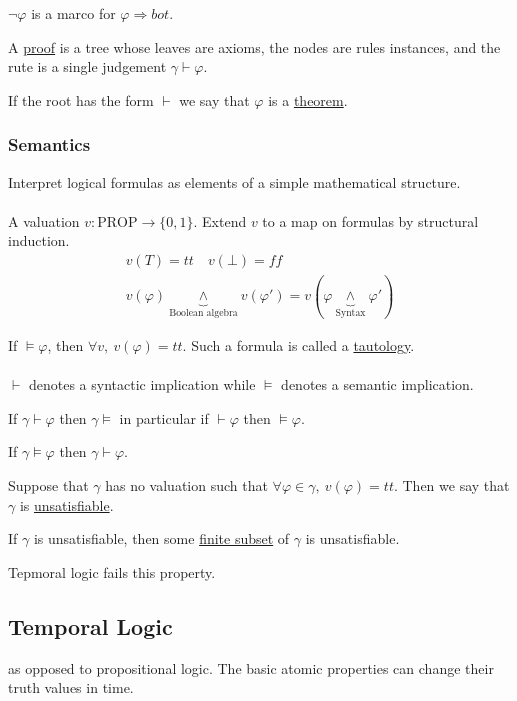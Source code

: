 \documentclass[../598comp.tex]{subfiles}
\begin{document}
$\neg \varphi$ is a marco for $\varphi \Rightarrow bot$.

A \ul{proof} is a tree whose leaves are axioms, the nodes are rules instances,
and the rute is a single judgement $\gamma \vdash \varphi$.

If the root has the form $\vdash$ we say that $\varphi$ is a \ul{theorem}.

\subsubsection{Semantics}
Interpret logical formulas as elements of a simple mathematical structure.
\\\\
A valuation $v: \text{PROP} \to \{0, 1\}$. Extend $v$ to a map on formulas by
structural induction.
\begin{gather*}
  v(T) = tt \quad v(\bot) = ff \\
  v(\varphi) \underbrace{\wedge}_{\text{Boolean algebra}} v(\varphi') = v(\varphi \underbrace{\wedge}_{\text{Syntax}}\varphi')
\end{gather*}

If $\models \varphi$, then $\forall v, \ v(\varphi) = tt$. Such a formula is
called a \ul{tautology}.
\\\\
$\vdash$ denotes a syntactic implication while $\models$ denotes a semantic implication.

\begin{theorem}[Soundness]
  If $\gamma \vdash \varphi$ then $\gamma \models$ in particular if $\vdash \varphi$
  then $\models \varphi$.
\end{theorem}
\begin{theorem}[Completeness]
  If $\gamma \models \varphi$ then $\gamma \vdash \varphi$.
\end{theorem}

Suppose that $\gamma$ has no valuation such that $\forall \varphi \in \gamma, \
v(\varphi) = tt$. Then we say that $\gamma$ is \ul{unsatisfiable}.

\begin{theorem}[Compactness]
  If $\gamma$ is unsatisfiable, then some \ul{finite subset} of $\gamma$ is unsatisfiable.
\end{theorem}
\begin{remark}
  Tepmoral logic fails this property.
\end{remark}

\subsection{Temporal Logic}
as opposed to propositional logic. The basic atomic properties can change their truth values in time.
\end{document}

